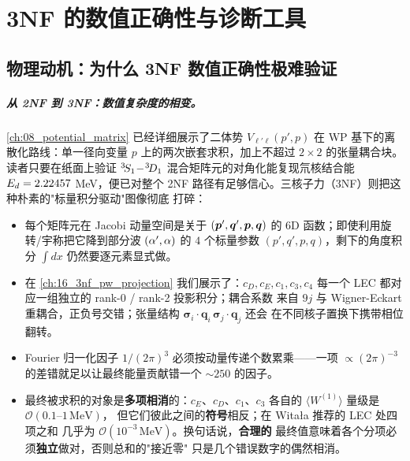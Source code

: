 
\chapter{3NF 的数值正确性与诊断工具}
\label{ch:17_3nf_numerical}

\section{物理动机：为什么 3NF 数值正确性极难验证}
\label{sec:ch17-motivation}

\paragraph{从 2NF 到 3NF：数值复杂度的相变。}
\cref{ch:08_potential_matrix} 已经详细展示了二体势 \(V_{\ell'\ell}(p',p)\) 在
WP 基下的离散化路线：单一径向变量 \(p\) 上的两次嵌套求积，加上不超过
\(2\times 2\) 的张量耦合块。读者只要在纸面上验证 \({}^{3}\!S_{1}\!-\!{}^{3}\!D_{1}\)
混合矩阵元的对角化能复现氘核结合能 \(E_d = 2.22457\) MeV，便已对整个 2NF
路径有足够信心。三核子力（3NF）则把这种朴素的"标量积分驱动"图像彻底
打碎：

\begin{itemize}
  \item 每个矩阵元在 Jacobi 动量空间是关于 \((\bm{p}', \bm{q}', \bm{p}, \bm{q})\)
        的 6D 函数；即使利用旋转/宇称把它降到部分波 \((\alpha', \alpha)\)
        的 \(4\) 个标量参数 \((p', q', p, q)\)，剩下的角度积分 \(\int dx\)
        仍然要逐元素显式做。
  \item 在 \cref{ch:16_3nf_pw_projection} 我们展示了：\(c_D, c_E, c_1, c_3, c_4\)
        每一个 LEC 都对应一组独立的 rank-0 / rank-2 投影积分；耦合系数
        来自 \(9j\) 与 Wigner-Eckart 重耦合，正负号交错；张量结构
        \(\bm{\sigma}_i \cdot \bm{q}_i\, \bm{\sigma}_j \cdot \bm{q}_j\) 还会
        在不同核子置换下携带相位翻转。
  \item Fourier 归一化因子 \(1/(2\pi)^3\) 必须按动量传递个数累乘——一项
        \(\propto (2\pi)^{-3}\) 的差错就足以让最终能量贡献错一个 \(\sim 250\) 的因子。
  \item 最终被求积的对象是\textbf{多项相消}的：\(c_E\)、\(c_D\)、\(c_1\)、\(c_3\)
        各自的 \(\langle W^{(1)}\rangle\) 量级是 \(\mathcal{O}(0.1\text{--}1\,\mathrm{MeV})\)，
        但它们彼此之间的\textbf{符号}相反；在 Witała 推荐的 LEC 处四项之和
        几乎为 \(\mathcal{O}(10^{-3}\,\mathrm{MeV})\)。换句话说，\textbf{合理的}
        最终值意味着各个分项必须\textbf{独立}做对，否则总和的"接近零"
        只是几个错误数字的偶然相消。
\end{itemize}

